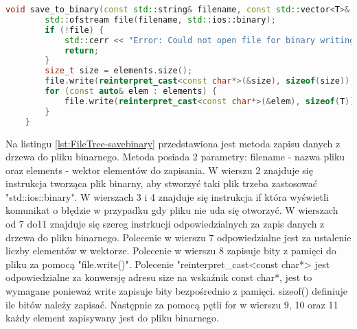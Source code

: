 \begin{lstlisting}[caption=Metoda \texttt{save\_to\_binary}, label={lst:FileTree-savebinary}, language=C++]
	void save_to_binary(const std::string& filename, const std::vector<T>& elements) {
		std::ofstream file(filename, std::ios::binary);
		if (!file) {
			std::cerr << "Error: Could not open file for binary writing.\n";
			return;
		}
		size_t size = elements.size();
		file.write(reinterpret_cast<const char*>(&size), sizeof(size));
		for (const auto& elem : elements) {
			file.write(reinterpret_cast<const char*>(&elem), sizeof(T));
		}
	}
\end{lstlisting}
Na listingu \ref{lst:FileTree-savebinary} przedstawiona jest metoda zapisu danych z drzewa do pliku binarnego. Metoda posiada 2 parametry: filename - nazwa pliku oraz elements - wektor elementów do zapisania.
W wierszu 2 znajduje się instrukcja tworząca plik binarny, aby stworzyć taki plik trzeba zastosować "std::ios::binary".
W wierszach 3 i 4 znajduje się instrukcja if która wyświetli komunikat o błędzie w przypadku gdy pliku nie uda się otworzyć.
W wierszach od 7 do11 znajduje się szereg instrkucji odpowiedzialnych za zapis danych z drzewa do pliku binarnego.
Polecenie w wierszu 7 odpowiedzialne jest za ustalenie liczby elementów w wektorze.
Polecenie w wierszu 8 zapisuje bity z pamięci do pliku za pomocą "file.write()". Polecenie "reinterpret\_cast<const char*> jest odpowiedzialne za konwersję adresu size na wskaźnik const char*, jest to wymagane ponieważ write zapisuje bity bezpośrednio z pamięci. sizeof() definiuje ile bitów należy zapisać.
Następnie za pomocą pętli for w wierszu 9, 10 oraz 11 każdy element zapisywany jest do pliku binarnego.

